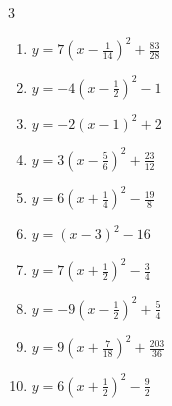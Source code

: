 \begin{multicols}{3}
\begin{enumerate}
  \item $\displaystyle y=7\left( x-\frac{1}{14}\right)^{2}+\frac{83}{28}$


  \item $\displaystyle y=-4\left( x-\frac{1}{2}\right)^{2}-1$


  \item $\displaystyle y=-2\left( x-1\right)^{2}+2$

        \phantom{$\displaystyle 頂点\left( 1 , 2 \right)$}

  \item $\displaystyle y=3\left( x-\frac{5}{6}\right)^{2}+\frac{23}{12}$


  \item $\displaystyle y=6\left( x+\frac{1}{4}\right)^{2}-\frac{19}{8}$


  \item $\displaystyle y=\left( x-3\right)^{2}-16$

        \phantom{$\displaystyle 頂点\left( 3 , -16 \right)$}

\columnbreak %

\resetques

  \item $\displaystyle y=7\left( x+\frac{1}{2}\right)^{2}-\frac{3}{4}$


  \item $\displaystyle y=-9\left( x-\frac{1}{2}\right)^{2}+\frac{5}{4}$


  \item $\displaystyle y=9\left( x+\frac{7}{18}\right)^{2}+\frac{203}{36}$


  \item $\displaystyle y=6\left( x+\frac{1}{2}\right)^{2}-\frac{9}{2}$


\end{enumerate}
\end{multicols}
